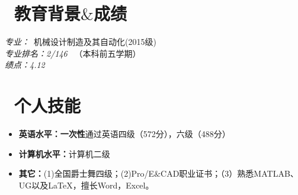 \documentclass{resume}
\begin{document}
\section{\faGraduationCap\  教育背景$\&$成绩}
\textit{\large{专业：}}\ 机械设计制造及其自动化(2015级) \\
\textit{\large{专业排名：2/146}} \ （本科前五学期） \\
\textit{\large{绩点：4.12}}

\section{\faCogs\ 个人技能}
\begin{itemize}
  \item \textbf{英语水平：}\textbf{一次性}通过英语四级（572分），六级（488分）
  \item \textbf{计算机水平：}计算机二级
  \item \textbf{其它：}(1)全国爵士舞四级；(2)Pro/E$\&$CAD职业证书；（3）熟悉MATLAB、UG以及LaTeX，擅长Word，Excel。
\end{itemize}


\end{document}
